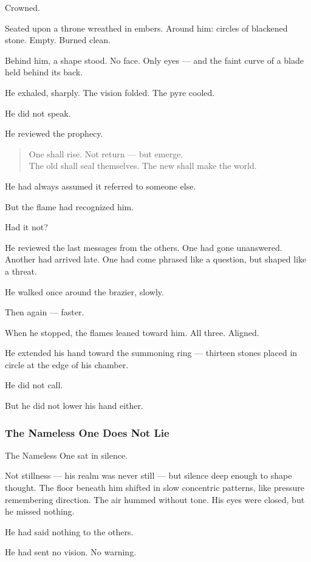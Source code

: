 \documentclass[12pt]{article}
\begin{document}
Crowned.

Seated upon a throne wreathed in embers. Around him: circles of blackened stone. Empty. Burned clean.

Behind him, a shape stood. No face. Only eyes — and the faint curve of a blade held behind its back.

He exhaled, sharply. The vision folded. The pyre cooled.

He did not speak.

He reviewed the prophecy.

\begin{quote}
One shall rise. Not return — but emerge.\\
The old shall seal themselves. The new shall make the world.
\end{quote}

He had always assumed it referred to someone else.

But the flame had recognized him.

Had it not?

He reviewed the last messages from the others. One had gone unanswered. Another had arrived late. One had come phrased like a question, but shaped like a threat.

He walked once around the brazier, slowly.

Then again — faster.

When he stopped, the flames leaned toward him. All three. Aligned.

He extended his hand toward the summoning ring — thirteen stones placed in circle at the edge of his chamber.

He did not call.

But he did not lower his hand either.


\dotfill

\subsubsection*{The Nameless One Does Not Lie}

The Nameless One sat in silence.

Not stillness — his realm was never still — but silence deep enough to shape thought. The floor beneath him shifted in slow concentric patterns, like pressure remembering direction. The air hummed without tone. His eyes were closed, but he missed nothing.

He had said nothing to the others.

He had sent no vision. No warning.
\end{document}
